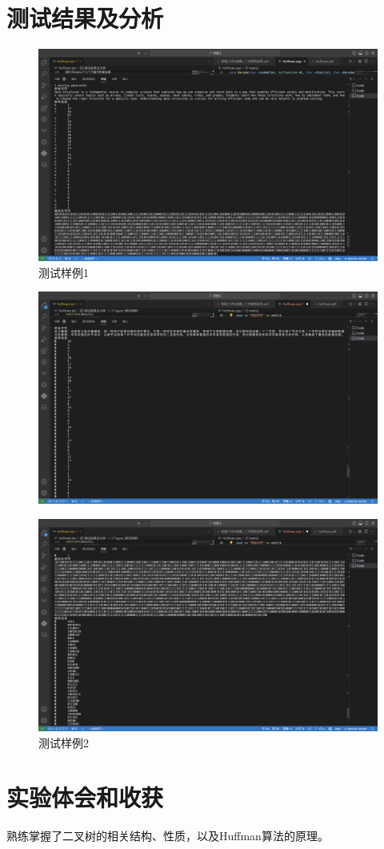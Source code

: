 \documentclass[UTF8]{ctexart}
\begin{document}
\section{测试结果及分析}
\begin{figure}[H]
  \centering
  \includegraphics[scale=0.25]{test1.png}
  \caption{测试样例1}
\end{figure}
\begin{figure}[H]
  \centering
  \includegraphics[scale=0.25]{test2.png}
\end{figure}
\begin{figure}[H]
  \centering
  \includegraphics[scale=0.25]{test3.png}
  \caption{测试样例2}
\end{figure}
\section{实验体会和收获}
熟练掌握了二叉树的相关结构、性质，以及Huffman算法的原理。
\end{document}
